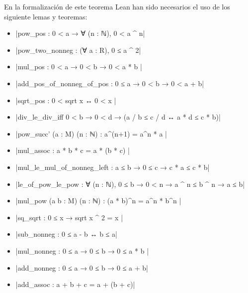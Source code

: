 En la formalización de este teorema Lean han sido necesarios el uso
de los siguiente lemas y teoremas:
\begin{itemize}
\item {}|pow_pos : 0 < a → ∀ (n : ℕ), 0 < a ^ n|
\item {}|pow_two_nonneg : (∀ a : R), 0 ≤ a ^ 2|
\item {}|mul_pos : 0 < a → 0 < b → 0 < a * b |
\item {}|add_pos_of_nonneg_of_pos : 0 ≤ a → 0 < b → 0 < a + b|
\item {}|sqrt_pos : 0 < sqrt x ↔ 0 < x |
\item {}|div_le_div_iff 0 < b → 0 < d → (a / b ≤ c / d ↔ a * d ≤ c * b)|
\item {}|pow_succ' (a : M) (n : ℕ) : a^(n+1) = a^n * a |
\item {}|mul_assoc : a * b * c = a * (b * c) |
\item {}|mul_le_mul_of_nonneg_left : a ≤ b → 0 ≤ c → c * a ≤ c * b|
\item {}|le_of_pow_le_pow : ∀ (n : ℕ), 0 ≤ b → 0 < n → a ^ n ≤ b ^ n → a ≤ b|
\item {}|mul_pow (a b : M) (n : ℕ) : (a * b)^n = a^n * b^n |
\item {}|sq_sqrt : 0 ≤ x → sqrt x ^ 2 = x |
\item {}|sub_nonneg : 0 ≤ a - b ↔ b ≤ a|
\item {}|mul_nonneg : 0 ≤ a → 0 ≤ b → 0 ≤ a * b |
\item {}|add_nonneg : 0 ≤ a → 0 ≤ b → 0 ≤ a + b|
\item {}|add_assoc : a + b + c = a + (b + c)|
\end{itemize}



